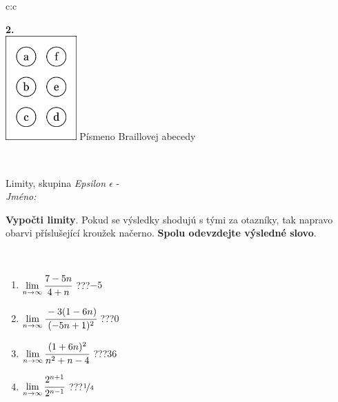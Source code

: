\documentclass[10pt]{report}
\begin{document}
\begin{tabular}{c:c}
\begin{minipage}[c][104.5mm][t]{0.5\linewidth}
\begin{center}
\begin{minipage}{0.20\linewidth}
\begin{center}
{\Huge\bfseries 2.} \\[2mm]
\includegraphics[height=40mm]{../images/braille.png}
{\small Písmeno Braillovej abecedy}
\end{center}
\end{minipage}
\end{center}
\end{minipage}
\\ \hdashline
\begin{minipage}[c][104.5mm][t]{0.5\linewidth}
\begin{center}
\vspace{7mm}
{\huge Limity, skupina \textit{Epsilon $\epsilon$} -}\\[5mm]
\textit{Jméno:}\phantom{xxxxxxxxxxxxxxxxxxxxxxxxxxxxxxxxxxxxxxxxxxxxxxxxxxxxxxxxxxxxxxxxx}\\[5mm]
\begin{minipage}{0.95\linewidth}
\begin{center}
\textbf{Vypočti limity}. Pokud se výsledky shodujú s tými za otazníky, tak napravo\\obarvi příslušející kroužek načerno. \textbf{Spolu odevzdejte výsledné slovo}.
\end{center}
\end{minipage}
\\[1mm]
\begin{minipage}{0.79\linewidth}
\begin{center}
\begin{varwidth}{\linewidth}
\begin{enumerate}
\normalsize
\item $\lim\limits_{n\to\infty}\cfrac{7-5n}{4+n}$\quad \dotfill\; ???\;\dotfill \quad $-5$
\item $\lim\limits_{n\to\infty}\cfrac{-3(1-6n)}{(-5n+1)^2}$\quad \dotfill\; ???\;\dotfill \quad $0$
\item $\lim\limits_{n\to\infty}\cfrac{(1+6n)^2}{n^2+n-4}$\quad \dotfill\; ???\;\dotfill \quad $36$
\item $\lim\limits_{n\to\infty}\cfrac{2^{n+1}}{2^{n-1}}$\quad \dotfill\; ???\;\dotfill \quad $\nicefrac{1}{4}$

\end{enumerate}
\end{varwidth}
\end{center}
\end{minipage}
\end{center}
\end{minipage}
\end{tabular}
\end{document}
